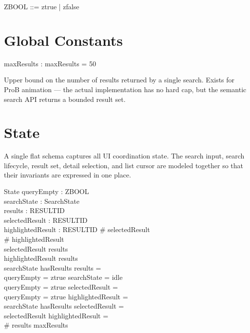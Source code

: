 \documentclass[a4paper,10pt,fleqn]{article}
\begin{document}
\begin{zed}
  ZBOOL ::= ztrue | zfalse
\end{zed}

\section{Global Constants}

\begin{axdef}
  maxResults : \nat
  \where
  maxResults = 50
\end{axdef}

Upper bound on the number of results returned by a single search. Exists
for ProB animation --- the actual implementation has no hard cap, but
the semantic search API returns a bounded result set.

\section{State}

A single flat schema captures all UI coordination state. The search
input, search lifecycle, result set, detail selection, and list cursor
are modeled together so that their invariants are expressed in one place.

\begin{schema}{State}
  queryEmpty : ZBOOL \\
  searchState : SearchState \\
  results : \finset RESULTID \\
  selectedResult : \finset RESULTID \\
  highlightedResult : \finset RESULTID
  \where
  \# selectedResult  \\
  \# highlightedResult  \\
  selectedResult \subseteq results \\
  highlightedResult \subseteq results \\
  searchState \neq hasResults \implies results = \emptyset \\
  queryEmpty = ztrue \implies searchState = idle \\
  queryEmpty = ztrue \implies selectedResult = \emptyset \\
  queryEmpty = ztrue \implies highlightedResult = \emptyset \\
  searchState \neq hasResults \implies selectedResult = \emptyset \\
  selectedResult \neq \emptyset \implies highlightedResult = \emptyset \\
  \# results \leq maxResults
\end{schema}
\end{document}
